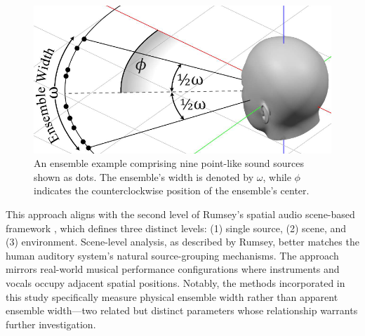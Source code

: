 \begin{figure}[htbp]
	\begin{center}
		\includegraphics[width=1.0\linewidth]{img/figx.png} 
	\end{center}
	\caption{An ensemble example comprising nine point-like sound sources shown as dots. The ensemble's width is denoted by $\omega$, while $\phi$ indicates the counterclockwise position of the ensemble's center.} \label{fig:figx}
\end{figure}

This approach aligns with the second level of Rumsey's spatial audio scene-based framework \cite{rumsey_spatial_2002}, which defines three distinct levels: (1) single source, (2) scene, and (3) environment. Scene-level analysis, as described by Rumsey, better matches the human auditory system's natural source-grouping mechanisms. The approach mirrors real-world musical performance configurations where instruments and vocals occupy adjacent spatial positions. Notably, the methods incorporated in this study specifically measure physical ensemble width rather than apparent ensemble width---two related but distinct parameters whose relationship warrants further investigation.
